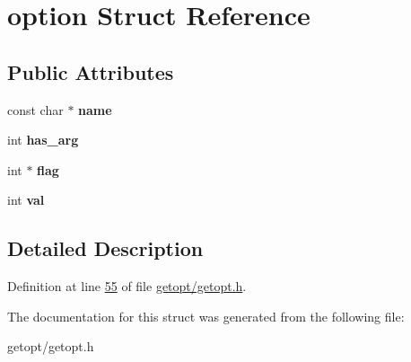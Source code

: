 \hypertarget{structoption}{}\section{option Struct Reference}
\label{structoption}
\subsection*{Public Attributes}
\begin{DoxyCompactItemize}
\item 
\mbox{\label{structoption_ae02f2d0cea6af34951d9008be8bfa625}} 
const char $\ast$ {\bfseries name}
\item 
\mbox{\label{structoption_a90d7ee9a51eea5c002682dbd0af149e4}} 
int {\bfseries has\+\_\+arg}
\item 
\mbox{\label{structoption_a24ad4639d5d498fdc1c5b38bcaabc263}} 
int $\ast$ {\bfseries flag}
\item 
\mbox{\label{structoption_a13bd155ec3b405d29c41ab8d0793be11}} 
int {\bfseries val}
\end{DoxyCompactItemize}


\subsection{Detailed Description}


Definition at line \hyperlink{getopt_2getopt_8h_source_l00055}{55} of file \hyperlink{getopt_2getopt_8h_source}{getopt/getopt.\+h}.



The documentation for this struct was generated from the following file\+:\begin{DoxyCompactItemize}
\item 
getopt/getopt.\+h\end{DoxyCompactItemize}
